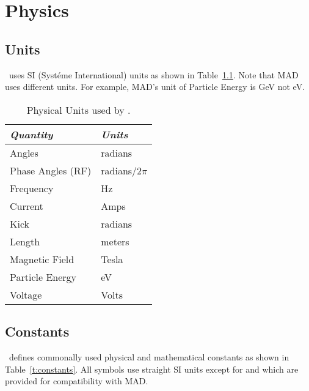 \chapter{Physics}

\section{Units}

\bmad\ uses SI (Syst\'eme International) units as shown in
Table~\ref{t:units}.  Note that MAD uses different units. For example,
MAD's unit of Particle Energy is GeV not eV.
\begin{table}[h]
\centering
\begin{tabular}{|l|l|} \hline
  {\em Quantity}     & {\em Units}       \\ \hline
  Angles             &    radians        \\ 
  Phase Angles (RF)  &    radians/2$\pi$ \\ 
  Frequency          &    Hz             \\ 
  Current            &    Amps           \\ 
  Kick               &    radians        \\ 
  Length             &    meters         \\ 
  Magnetic Field     &    Tesla          \\ 
  Particle Energy    &    eV             \\ 
  Voltage            &    Volts          \\ \hline
\end{tabular}
\caption{Physical Units used by \bmad.}
\label{t:units}
\end{table}


\section{Constants}

\bmad\ defines commonally used physical and mathematical constants as
shown in Table~\ref{t:constants}.  All symbols use straight SI units
except for  and  which are provided for
compatibility with MAD.

